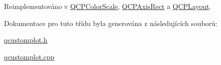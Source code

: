 Reimplementováno v \hyperlink{classQCPColorScale_ab8f6991ac88243fc582b44b183670334}{Q\+C\+P\+Color\+Scale}, \hyperlink{classQCPAxisRect_a255080a017df9083a60a321ef2ba9ed8}{Q\+C\+P\+Axis\+Rect} a \hyperlink{classQCPLayout_a34ab477e820537ded7bade4399c482fd}{Q\+C\+P\+Layout}.



Dokumentace pro tuto třídu byla generována z následujících souborů\+:\begin{DoxyCompactItemize}
\item 
\hyperlink{qcustomplot_8h}{qcustomplot.\+h}\item 
\hyperlink{qcustomplot_8cpp}{qcustomplot.\+cpp}\end{DoxyCompactItemize}
